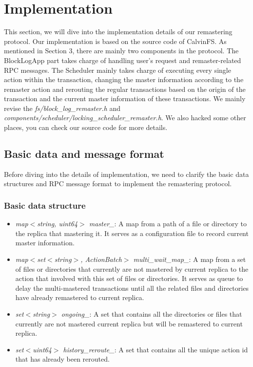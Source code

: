 \section{Implementation}
This section, we will dive into the implementation details of our remastering protocol. Our implementation is based on the source code of CalvinFS\cite{}. As mentioned in Section 3, there are mainly two components in the protocol. The BlockLogApp part takes charge of handling user's request and remaster-related RPC messages. The Scheduler mainly takes charge of executing every single action within the transaction, changing the master information according to the remaster action and rerouting the regular transactions based on the origin of the transaction and the current master information of these transactions. We mainly revise the \emph{fs/block\_log\_remaster.h} and \emph{components/scheduler/locking\_scheduler\_remaster.h}. We also hacked some other places, you can check our source code for more details.

\subsection{Basic data and message format}
Before diving into the details of implementation, we need to clarify the basic data structures and RPC message format to implement the remastering protocol.
\subsubsection{Basic data structure}
\begin{itemize}
\item \emph{map$<$string, uint64$>$ master\_}:
A map from a path of a file or directory to the replica that mastering it. It serves as a configuration file to record current master information. 
\item \emph{map$<$set$<$string$>$, ActionBatch$>$ multi\_wait\_map\_}:
A map from a set of files or directories that currently are not mastered by current replica to the action that involved with this set of files or directories. It serves as queue to delay the multi-mastered transactions until all the related files and directories have already remastered to current replica. 
\item \emph{set$<$string$>$ ongoing\_}:
A set that contains all the directories or files that currently are not mastered current replica but will be remastered to current replica. 
\item \emph{set$<$uint64$>$ history\_reroute\_}: 
A set that contains all the unique action id that has already been rerouted. 
\end{itemize}
